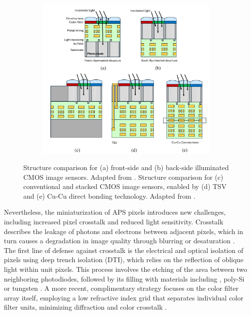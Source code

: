 \begin{figure}[htbp]
    \centering
    \begin{subfigure}[t]{0.99\textwidth} %
        \centering
        \includegraphics[width=\textwidth]{chapters/introduction/image/front_back_side_and_stacking.pdf} 
    \end{subfigure}
    \caption[Technological breakthroughs for the reduction of the APS area.]{Structure comparison for (a) front-side and (b) back-side illuminated CMOS image sensors. Adapted from \cite{SONY2008SonyNoise}. Structure comparison for (c) conventional and stacked CMOS image sensors, enabled by (d) TSV and (e) Cu-Cu direct bonding technology. Adapted from \cite{Kagawa20193DSensors}.}
    \label{fig:ch1:backside_and_stacking}
\end{figure}

Nevertheless, the miniaturization of APS pixels introduces new challenges, including increased pixel crosstalk and reduced light sensitivity. Crosstalk describes the leakage of photons and electrons between adjacent pixels, which in turn causes a degradation in image quality through blurring or desaturation \cite{Kim2022CrosstalkDeconvolution}. The first line of defense against crosstalk is the electrical and optical isolation of pixels using deep trench isolation (DTI), which relies on the reflection of oblique light within unit pixels. This process involves the etching of the area between two neighboring photodiodes, followed by its filling with materials including , poly-Si or tungsten \cite{Ahn2014AGate, Okawa2019ALevel, Kim2020ATechnology, Park20217.9Isolation}. A more recent, complimentary strategy focuses on the color filter array itself, employing a low refractive index grid that separates individual color filter units, minimizing diffraction and color crosstalk \cite{Han_Lin1.1umImprovement}.

